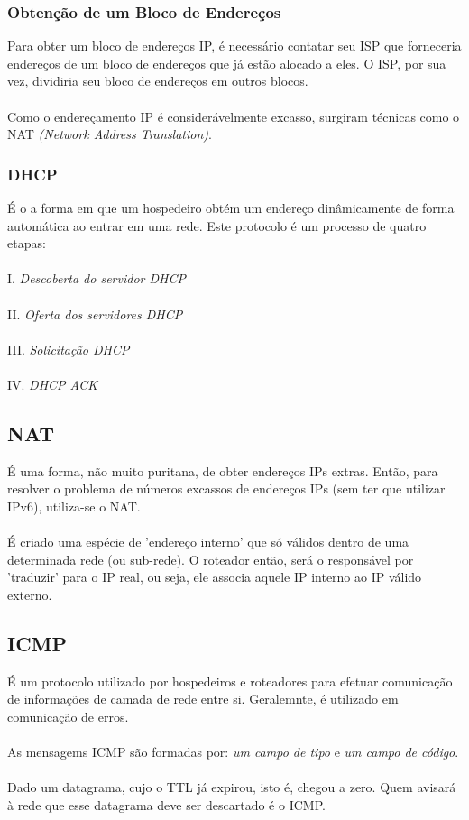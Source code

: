 \documentclass[a4paper, 12pt]{article}
\begin{document}
        \subsubsection{Obtenção de um Bloco de Endereços}
        Para obter um bloco de endereços IP, é necessário contatar seu ISP que forneceria endereços de um bloco de endereços que já
        estão alocado a eles. O ISP, por sua vez, dividiria seu bloco de endereços em outros blocos.
        \\\\
        Como o endereçamento IP é considerávelmente excasso, surgiram técnicas como o NAT \textit{(Network Address Translation)}.

        \subsubsection{DHCP}
        É o a forma em que um hospedeiro obtém um endereço dinâmicamente de forma automática ao entrar em uma rede. Este protocolo 
        é um processo de quatro etapas:
        \\\\
                I. \textit{Descoberta do servidor DHCP}
        \\\\
                II. \textit{Oferta dos servidores DHCP} 
        \\\\
                III. \textit{Solicitação DHCP}
        \\\\
                IV. \textit{DHCP ACK}

    
    \subsection{NAT}
        É uma forma, não muito puritana, de obter endereços IPs extras. Então, para resolver o problema de números excassos de
        endereços IPs (sem ter que utilizar IPv6), utiliza-se o NAT.
        \\\\
        É criado uma espécie de 'endereço interno' que só válidos dentro de uma determinada rede (ou sub-rede). O roteador então, será
         o responsável por 'traduzir' para o IP real, ou seja, ele associa aquele IP interno ao IP válido externo.

    \subsection{ICMP}
    É um protocolo utilizado por hospedeiros e roteadores para efetuar comunicação de informações de camada de rede entre si. Geralemnte,
    é utilizado em comunicação de erros.
    \\\\
    As mensagems ICMP são formadas por: \textit{um campo de tipo} e \textit{um campo de código}.
    \\\\
    Dado um datagrama, cujo o TTL já expirou, isto é, chegou a zero. Quem avisará à rede que esse datagrama deve ser descartado é o ICMP.
\end{document}
